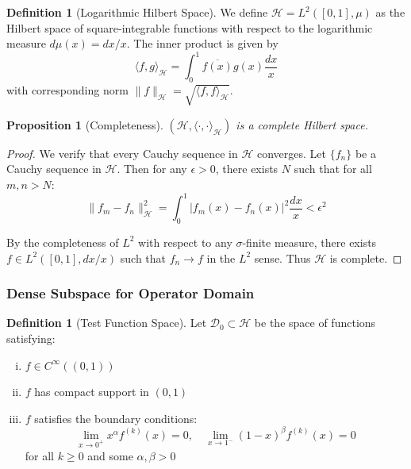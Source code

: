 \documentclass[12pt,letterpaper]{article}
\theoremstyle{plain}
\newtheorem{proposition}[theorem]{Proposition}
\theoremstyle{definition}
\newtheorem{definition}[theorem]{Definition}
\theoremstyle{remark}
\newcommand{\inner}[2]{\langle #1, #2 \rangle}
\newcommand{\norm}[1]{\|#1\|}
\newcommand{\hilbert}{\mathcal{H}}
\newcommand{\conj}[1]{\overline{#1}}
\begin{document}
\begin{definition}[Logarithmic Hilbert Space]\label{def:hilbert_space}
We define $\hilbert = L^2([0,1], \mu)$ as the Hilbert space of square-integrable functions with respect to the logarithmic measure $d\mu(x) = dx/x$. The inner product is given by
\begin{equation}\label{eq:inner_product}
\inner{f}{g}_{\hilbert} = \int_0^1 \conj{f(x)}g(x)\frac{dx}{x}
\end{equation}
with corresponding norm $\norm{f}_{\hilbert} = \sqrt{\inner{f}{f}_{\hilbert}}$.
\end{definition}

\begin{proposition}[Completeness]\label{prop:completeness}
$(\hilbert, \inner{\cdot}{\cdot}_{\hilbert})$ is a complete Hilbert space.
\end{proposition}

\begin{proof}
We verify that every Cauchy sequence in $\hilbert$ converges. Let $\{f_n\}$ be a Cauchy sequence in $\hilbert$. Then for any $\epsilon > 0$, there exists $N$ such that for all $m, n > N$:
\begin{equation}
\norm{f_m - f_n}_{\hilbert}^2 = \int_0^1 |f_m(x) - f_n(x)|^2 \frac{dx}{x} < \epsilon^2
\end{equation}

By the completeness of $L^2$ with respect to any $\sigma$-finite measure, there exists $f \in L^2([0,1], dx/x)$ such that $f_n \to f$ in the $L^2$ sense. Thus $\hilbert$ is complete.
\end{proof}

\subsubsection{Dense Subspace for Operator Domain}

\begin{definition}[Test Function Space]\label{def:dense_domain}
Let $\mathcal{D}_0 \subset \hilbert$ be the space of functions satisfying:
\begin{enumerate}[(i)]
\item $f \in C^{\infty}((0,1))$
\item $f$ has compact support in $(0,1)$
\item $f$ satisfies the boundary conditions:
\begin{equation}
\lim_{x \to 0^+} x^{\alpha}f^{(k)}(x) = 0, \quad \lim_{x \to 1^-} (1-x)^{\beta}f^{(k)}(x) = 0
\end{equation}
for all $k \geq 0$ and some $\alpha, \beta > 0$
\end{enumerate}
\end{definition}
\end{document}

